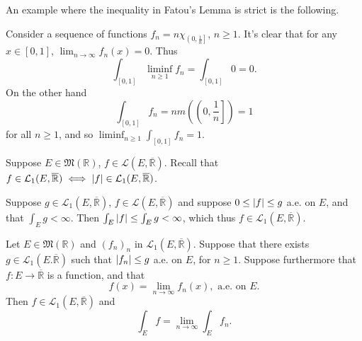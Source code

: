 \documentclass[notoc,notitlepage]{tufte-book}
\begin{document}
An example where the inequality in Fatou's Lemma is strict is the following.

\begin{eg}
  Consider a sequence of functions $f_n = n\chi_{\left(0, \frac{1}{n}\right]}$,
  $n \geq 1$. It's clear that for any $x \in [0, 1]$, $\lim_{n \to \infty}
  f_n(x) = 0$. Thus
  \begin{equation*}
    \int_{[0, 1]} \liminf_{n \geq 1} f_n = \int_{[0, 1]} 0 = 0.
  \end{equation*}
  On the other hand
  \begin{equation*}
    \int_{[0, 1]} f_n = n m \left( \left( 0, \frac{1}{n} \right] \right) = 1
  \end{equation*}
  for all $n \geq 1$, and so $\liminf_{n \geq 1} \int_{[0, 1]} f_n = 1$.
\end{eg}

\begin{eg}
  Suppose $E \in \mathfrak{M}(\mathbb{R})$, $f \in \mathcal{L}(E,
  \overline{\mathbb{R}})$. Recall that $f \in \mathcal{L}_1(E,
  \overline{\mathbb{R}}) \iff \left|f\right| \in \mathcal{L}_1(E,
  \overline{\mathbb{R}})$.

  Suppose $g \in \mathcal{L}_1(E, \overline{\mathbb{R}})$, $f \in
  \mathcal{L}(E, \overline{\mathbb{R}})$ and suppose $0 \leq \left|f\right| \leq g$ 
  a.e. on $E$, and that $\int_{E} g < \infty$. Then $\int_{E} \left|f\right| \leq
  \int_{E} g < \infty$, which thus $f \in \mathcal{L}_1(E,
  \overline{\mathbb{R}})$.
\end{eg}

\begin{thm}\label{thm:lebesgue_dominated_convergence_theorem}
  Let $E \in \mathfrak{M}(\mathbb{R})$ and $(f_n)_n$ in $\mathcal{L}_1(E,
  \overline{\mathbb{R}})$. Suppose that there exists $g \in \mathcal{L}_1(E.
  \overline{\mathbb{R}})$ such that $\left|f_n\right| \leq g$ a.e. on $E$, for $n \geq
  1$. Suppose furthermore that $f : E \to \overline{\mathbb{R}}$ is a function,
  and that
  \begin{equation*}
    f(x) = \lim_{n \to \infty} f_n(x), \text{ a.e. on } E.
  \end{equation*}
  Then $f \in \mathcal{L}_1(E, \overline{\mathbb{R}})$ and
  \begin{equation*}
    \int_{E} f = \lim_{n \to \infty} \int_{E} f_n.
  \end{equation*}
\end{thm}
\end{document}
